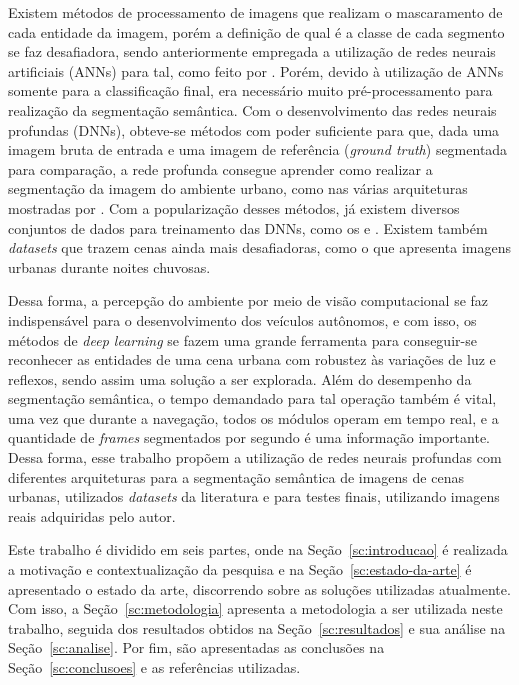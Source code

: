 \documentclass[conference]{IEEEtran}
\begin{document}
Existem métodos de processamento de imagens que realizam o mascaramento de cada entidade da imagem, porém a definição de qual é a classe de cada segmento se faz desafiadora, sendo anteriormente empregada a utilização de redes neurais artificiais (ANNs) para tal, como feito por \cite{vitor20132D3DVision}. Porém, devido à utilização de ANNs somente para a classificação final, era necessário muito pré-processamento para realização da segmentação semântica. Com o desenvolvimento das redes neurais profundas (DNNs), obteve-se métodos com poder suficiente para que, dada uma imagem bruta de entrada e uma imagem de referência (\textit{ground truth}) segmentada para comparação, a rede profunda consegue aprender como realizar a segmentação da imagem do ambiente urbano, como nas várias arquiteturas mostradas por \cite{papadeas2021RealTimeSemanticImage}. Com a popularização desses métodos, já existem diversos conjuntos de dados para treinamento das DNNs, como os \cite{cordts2016CityscapesDatasetSemantic} e \cite{brostow2008SegmentationRecognitionUsing,brostow2009SemanticObjectClasses}. Existem também \textit{datasets} que trazem cenas ainda mais desafiadoras, como o \cite{jin2021RaidaRRichAnnotated} que apresenta imagens urbanas durante noites chuvosas.

Dessa forma, a percepção do ambiente por meio de visão computacional se faz indispensável para o desenvolvimento dos veículos autônomos, e com isso, os métodos de \textit{deep learning} se fazem uma grande ferramenta para conseguir-se reconhecer as entidades de uma cena urbana com robustez às variações de luz e reflexos, sendo assim uma solução a ser explorada. Além do desempenho da segmentação semântica, o tempo demandado para tal operação também é vital, uma vez que durante a navegação, todos os módulos operam em tempo real, e a quantidade de \textit{frames} segmentados por segundo é uma informação importante. Dessa forma, esse trabalho propõem a utilização de redes neurais profundas com diferentes arquiteturas para a segmentação semântica de imagens de cenas urbanas, utilizados \textit{datasets} da literatura e para testes finais, utilizando imagens reais adquiridas pelo autor.

Este trabalho é dividido em seis partes, onde na Seção~\ref{sc:introducao} é realizada a motivação e contextualização da pesquisa e na Seção~\ref{sc:estado-da-arte} é apresentado o estado da arte, discorrendo sobre as soluções utilizadas atualmente. Com isso, a Seção~\ref{sc:metodologia} apresenta a metodologia a ser utilizada neste trabalho, seguida dos resultados obtidos na Seção~\ref{sc:resultados} e sua análise na Seção~\ref{sc:analise}. Por fim, são apresentadas as conclusões na Seção~\ref{sc:conclusoes} e as referências utilizadas.
\end{document}

